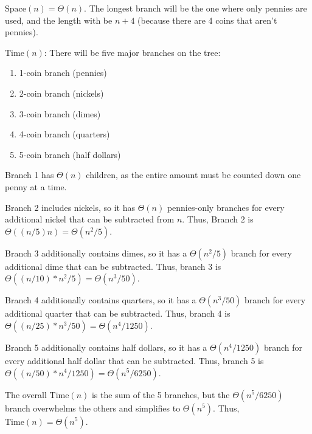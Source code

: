 \documentclass{article}
\begin{document}
$\textrm{Space}(n) = \Theta(n)$. The longest branch will be the one where only
pennies are used, and the length with be $n+4$ (because there are 4 coins that
aren't pennies).

$\textrm{Time}(n)$: There will be five major branches on the tree:
\begin{enumerate}
    \item 1-coin branch (pennies)
    \item 2-coin branch (nickels)
    \item 3-coin branch (dimes)
    \item 4-coin branch (quarters)
    \item 5-coin branch (half dollars)
\end{enumerate}

Branch 1 has $\Theta(n)$ children, as the entire amount must be counted down one
penny at a time.

Branch 2 includes nickels, so it has $\Theta(n)$ pennies-only
branches for every additional nickel that can be subtracted from $n$. Thus,
Branch 2 is $\Theta((n/5)n)=\Theta(n^2/5)$.

Branch 3 additionally contains dimes, so it has a $\Theta(n^2/5)$ branch for
every additional dime that can be subtracted. Thus, branch 3 is
$\Theta((n/10)*n^2/5)=\Theta(n^3/50)$.

Branch 4 additionally contains quarters, so it has a $\Theta(n^3/50)$ branch for
every additional quarter that can be subtracted. Thus, branch 4 is
$\Theta((n/25)*n^3/50)=\Theta(n^4/1250)$.

Branch 5 additionally contains half dollars, so it has a $\Theta(n^4/1250)$
branch for every additional half dollar that can be subtracted. Thus, branch 5
is $\Theta((n/50)*n^4/1250)=\Theta(n^5/6250)$.

The overall $\textrm{Time}(n)$ is the sum of the 5 branches, but the
$\Theta(n^5/6250)$ branch overwhelms the others and simplifies to $\Theta(n^5)$.
Thus, $\textrm{Time}(n)=\Theta(n^5)$.
\end{document}

